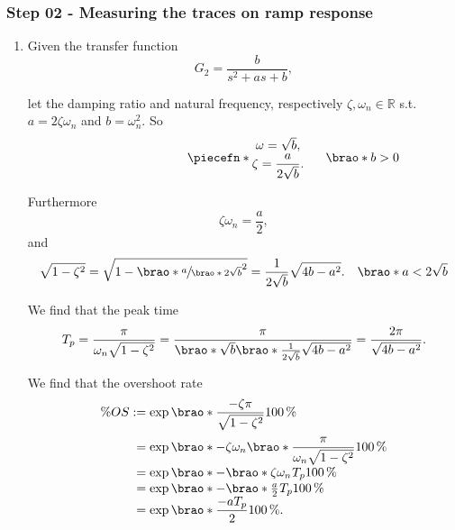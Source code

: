 \documentclass[12pt]{article}
\DeclarePairedDelimiter\brao()%
\DeclarePairedDelimiter\piecefn\{.
\begin{document}
\subsubsection{Step 02 - Measuring the traces on ramp response}

\begin{enumerate}
    \item
        Given the transfer function
        \begin{equation}
            G_2 = \frac{b}{s^2 + as + b},
        \end{equation}
        
        let the damping ratio and natural frequency, respectively $\zeta, \omega_n \in \mathbb{R}$ s.t. $a = 2\zeta\omega_n$ and $b = \omega_n^2$. So
        \begin{equation}
            \piecefn*{
                \begin{matrix}
                    \omega = \sqrt{b}\rlap, \\*
                    \zeta = \dfrac{a}{2\sqrt{b}}\rlap. \\*
                \end{matrix}
            }\rlap{$\qquad\brao*{b > 0}$}
        \end{equation}

        Furthermore
        \begin{equation}
            \zeta\omega_n = \frac{a}2,
        \end{equation}
        and
        \begin{equation}
            \sqrt{1 - \zeta^2} = \sqrt{1 - \brao*{\sfrac{a}{\brao*{2\sqrt{b}}}}^2} = \frac{1}{2\sqrt{b}} \sqrt{4b - a^2}.%
            \hskip1em\brao*{a < 2\sqrt{b}}
        \end{equation}
        
        We find that the peak time
        \begin{equation}
            T_p = \frac\pi{\omega_n \sqrt{1 - \zeta^2}} = \frac\pi{\brao*{\sqrt{b}}\brao*{ \frac{1}{2\sqrt{b}}\sqrt{4b - a^2}}} = \frac{2\pi}{\sqrt{4b - a^2}}.
        \end{equation}

        We find that the overshoot rate
        \begin{equation}
            \begin{array}{*2{@{}r}@{}l@{}}
                \% OS
                &{}:={}& \exp\brao*{\dfrac{-\zeta\pi}{\sqrt{1 - \zeta^2}}} \SI{100}\percent
            \\*[1.3em]
                &{}={}& \exp\brao*{-\zeta\omega_n\brao*{\dfrac{\pi}{\omega_n\sqrt{1 - \zeta^2}}}} \SI{100}\percent
            \\*
                &{}={}& \exp\brao*{-\brao*{\zeta\omega_n}^{\vphantom{1}}T_p} \SI{100}\percent
            \\*
                &{}={}& \exp\brao*{-\brao*{\tfrac{a}2}^{\vphantom{1}}T_p} \SI{100}\percent
            \\*
                & {}={} & \exp\brao*{\dfrac{-aT_p}{2}} \SI{100}\percent\rlap.
            \\*
            \end{array}
        \end{equation}


\end{enumerate}
\end{document}
